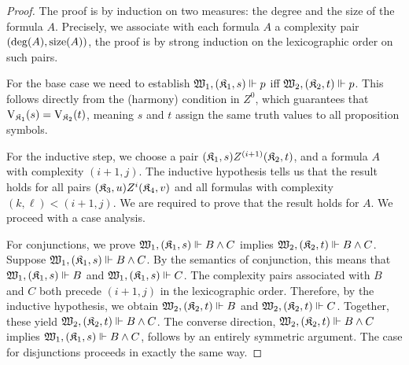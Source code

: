 \begin{proof}
    \setcounter{ieqnnum}{0}
    The proof is by induction on two measures: the degree and the size of the formula $A$.
	Precisely, we associate with each formula $A$ a complexity pair $\pair {\deg(A)} {\size(A)}$, the proof is by strong induction on the lexicographic order on such pairs.

    \medskip
    \noindent
    For the base case we need to establish $\xforces {\wmodel_1} {\pair {\kmodel_1} s} p$ iff $\xforces {\wmodel_2} {\pair {\kmodel_2} t} p$.
	This follows directly from the (harmony) condition in $Z^0$, which guarantees that $\Vkm[1](s) = \Vkm[2](t)$, meaning $s$ and $t$ assign the same truth values to all proposition symbols.

    \medskip
    \noindent
    For the inductive step, we choose a pair ${\pair {\kmodel_1} s} Z^{(i+1)} {\pair {\kmodel_2} t}$, and a formula $A$ with complexity $(i+1,j)$. The inductive hypothesis tells us that the result holds for all pairs ${\pair {\kmodel_3} u} Z^i {\pair {\kmodel_4} v}$ and all formulas with complexity $(k,\ell) < (i+1,j)$. We are required to prove that the result holds for $A$. We proceed with a case analysis.

	\medskip
    \noindent
    For conjunctions, we prove $\xforces{\wmodel_1}{\pair{\kmodel_1}{s}}{B \land C}$ implies $\xforces{\wmodel_2}{\pair{\kmodel_2}{t}}{B \land C}$.
	Suppose $\xforces{\wmodel_1}{\pair{\kmodel_1}{s}}{B \land C}$.
	By the semantics of conjunction, this means that $\xforces{\wmodel_1}{\pair{\kmodel_1}{s}}{B}$ and $\xforces{\wmodel_1}{\pair{\kmodel_1}{s}}{C}$.
	The complexity pairs associated with $B$ and $C$ both precede $(i+1,j)$ in the lexicographic order.
	Therefore, by the inductive hypothesis, we obtain $\xforces{\wmodel_2}{\pair{\kmodel_2}{t}}{B}$ and $\xforces{\wmodel_2}{\pair{\kmodel_2}{t}}{C}$. Together, these yield $\xforces{\wmodel_2}{\pair{\kmodel_2}{t}}{B \land C}$.
	The converse direction, $\xforces{\wmodel_2}{\pair{\kmodel_2}{t}}{B \land C}$ implies $\xforces{\wmodel_1}{\pair{\kmodel_1}{s}}{B \land C}$, follows by an entirely symmetric argument.
	The case for disjunctions proceeds in exactly the same way.


\end{proof}
